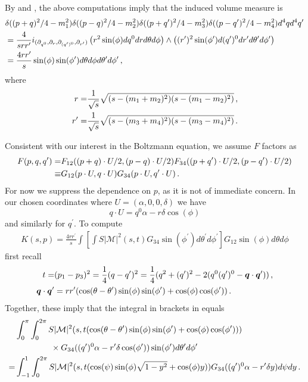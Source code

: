 By  and , the above computations imply that the induced volume measure is
\begin{align}
&\delta((p+q)^2/4-m_1^2)\delta((p-q)^2/4-m_2^2)\delta((p+q^{\prime})^2/4-m_3^2)\delta((p-q^{\prime})^2/4-m_4^2)d^4qd^4q^{\prime}\\
&=\frac{4}{srr^{\prime}}i_{(\partial_{q^0},\partial_{r},\partial _{(q^{\prime})^0},\partial_{r^{\prime}})}\left(r^2\sin(\phi)dq^0drd\theta d\phi\right)\wedge\left((r^{\prime})^2\sin(\phi^{\prime})d(q^{\prime})^0dr^{\prime}d\theta^{\prime}d\phi^{\prime}\right)\notag\\
&=\frac{4rr^{\prime}}{s}\sin(\phi)\sin(\phi^{\prime})d\theta d\phi d\theta^{\prime}d\phi^{\prime}\,,\notag
\end{align}
where
\begin{align}
r=&\frac{1}{\sqrt{s}}\sqrt{(s-(m_1+m_2)^2)(s-(m_1-m_2)^2)}\,,\\
r^{\prime}=&\frac{1}{\sqrt{s}}\sqrt{(s-(m_3+m_4)^2)(s-(m_3-m_4)^2)}\,.\notag
\end{align}


Consistent with our interest in the Boltzmann equation, we assume $F$ factors as
\begin{align}
 F(p,q,q^{\prime})=&F_{12}((p+q)\cdot U/2,(p-q)\cdot U/2)F_{34}((p+q^{\prime})\cdot U/2,(p-q^{\prime})\cdot U/2)\\
\equiv &G_{12}(p\cdot U,q\cdot U)G_{34}(p\cdot U,q^{\prime}\cdot U)\,.\notag
\end{align}
For now we suppress the dependence on $p$, as it is not of immediate concern. In our chosen coordinates where $U=(\alpha,0,0,\delta)$ we have
\begin{equation}
q\cdot U=q^0\alpha-r\delta\cos(\phi)
\end{equation}
and similarly for $q^{\prime}$.
To compute
\begin{align}\label{KAngular1}
K(s,p)=\frac{4rr^{\prime}}{s}\int \left[\int S |\mathcal{M}|^2 (s,t) G_{34}\sin(\phi^{\prime})d\theta^{\prime} d\phi^{\prime}\right] G_{12}\sin(\phi)d\theta d\phi
\end{align}
first recall 
\begin{align}
t=&(p_1-p_3)^2=\frac{1}{4}(q- q^{\prime})^2=\frac{1}{4}(q^2+(q^{\prime})^2-2(q^0(q^{\prime})^0-\vec{q}\cdot \vec{q}^{\prime}))\,,\\
\vec{q}\cdot\vec{q}^{\prime}&=rr^{\prime}(\cos(\theta-\theta^{\prime})\sin(\phi)\sin(\phi^{\prime})+\cos(\phi)\cos(\phi^{\prime}))\,.\notag
\end{align}
Together, these imply that the integral in brackets in   equals
\begin{align}
&\int_0^\pi\int_0^{2\pi} S |\mathcal{M}|^2 (s,t(\cos(\theta-\theta^{\prime})\sin(\phi)\sin(\phi^{\prime})+\cos(\phi)\cos(\phi^{\prime})))\\
&\hspace{15mm}\times G_{34}((q^{\prime})^0\alpha-r^{\prime}\delta\cos(\phi^{\prime}))\sin(\phi^{\prime})d\theta^{\prime} d\phi^{\prime}\notag\\
=&\int_{-1}^1\int_0^{2\pi} S |\mathcal{M}|^2 (s,t(\cos(\psi)\sin(\phi)\sqrt{1-y^2}+\cos(\phi)y)) G_{34}((q^{\prime})^0\alpha-r^{\prime}\delta y)d\psi dy\,.\notag
\end{align}


